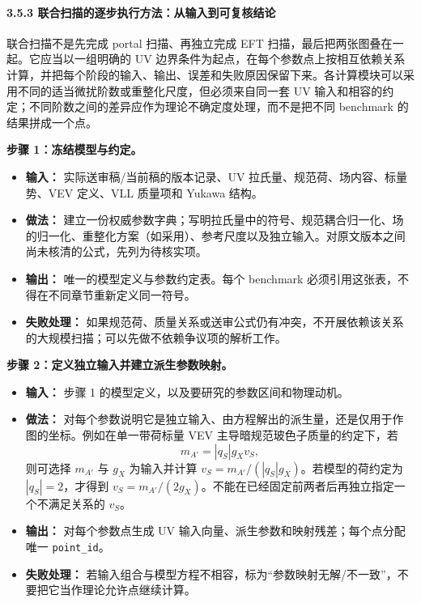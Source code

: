 \documentclass[
  chinese,
  UTF8]{ctexart}
\providecommand{\tightlist}{%
  \setlength{\itemsep}{0pt}\setlength{\parskip}{0pt}}
\begin{document}
\paragraph{3.5.3
联合扫描的逐步执行方法：从输入到可复核结论}\label{ux8054ux5408ux626bux63cfux7684ux9010ux6b65ux6267ux884cux65b9ux6cd5ux4eceux8f93ux5165ux5230ux53efux590dux6838ux7ed3ux8bba}

联合扫描不是先完成 portal 扫描、再独立完成 EFT
扫描，最后把两张图叠在一起。它应当以一组明确的 UV
边界条件为起点，在每个参数点上按相互依赖关系计算，并把每个阶段的输入、输出、误差和失败原因保留下来。各计算模块可以采用不同的适当微扰阶数或重整化尺度，但必须来自同一套
UV
输入和相容的约定；不同阶数之间的差异应作为理论不确定度处理，而不是把不同
benchmark 的结果拼成一个点。

\textbf{步骤 1：冻结模型与约定。}

\begin{itemize}
\tightlist
\item
  \textbf{输入：} 实际送审稿/当前稿的版本记录、UV
  拉氏量、规范荷、场内容、标量势、VEV 定义、VLL 质量项和 Yukawa 结构。
\item
  \textbf{做法：}
  建立一份权威参数字典；写明拉氏量中的符号、规范耦合归一化、场的归一化、重整化方案（如采用）、参考尺度以及独立输入。对原文版本之间尚未核清的公式，先列为待核实项。
\item
  \textbf{输出：} 唯一的模型定义与参数约定表。每个 benchmark
  必须引用这张表，不得在不同章节重新定义同一符号。
\item
  \textbf{失败处理：}
  如果规范荷、质量关系或送审公式仍有冲突，不开展依赖该关系的大规模扫描；可以先做不依赖争议项的解析工作。
\end{itemize}

\textbf{步骤 2：定义独立输入并建立派生参数映射。}

\begin{itemize}
\tightlist
\item
  \textbf{输入：} 步骤 1 的模型定义，以及要研究的参数区间和物理动机。
\item
  \textbf{做法：}
  对每个参数说明它是独立输入、由方程解出的派生量，还是仅用于作图的坐标。例如在单一带荷标量
  VEV 主导暗规范玻色子质量的约定下，若 \[
  m_{A'}=|q_S|g_Xv_S,
  \] 则可选择 \(m_{A'}\) 与 \(g_X\) 为输入并计算
  \(v_S=m_{A'}/(|q_S|g_X)\)。若模型的荷约定为 \(|q_S|=2\)，才得到
  \(v_S=m_{A'}/(2g_X)\)。不能在已经固定前两者后再独立指定一个不满足关系的
  \(v_S\)。
\item
  \textbf{输出：} 对每个参数点生成 UV
  输入向量、派生参数和映射残差；每个点分配唯一 \texttt{point\_id}。
\item
  \textbf{失败处理：}
  若输入组合与模型方程不相容，标为``参数映射无解/不一致''，不要把它当作理论允许点继续计算。
\end{itemize}
\end{document}
